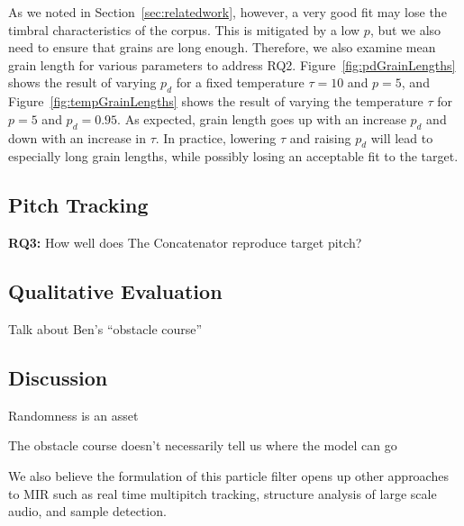 \documentclass{article}
\begin{document}
As we noted in Section~\ref{sec:relatedwork}, however, a very good fit may lose the timbral characteristics of the corpus.  This is mitigated by a low $p$, but we also need to ensure that grains are long enough.  Therefore, we also examine mean grain length for various parameters to address RQ2.  Figure~\ref{fig:pdGrainLengths} shows the result of varying $p_d$ for a fixed temperature $\tau=10$ and $p=5$, and Figure~\ref{fig:tempGrainLengths} shows the result of varying the temperature $\tau$ for $p=5$ and $p_d = 0.95$.  As expected, grain length goes up with an increase $p_d$ and down with an increase in $\tau$.  In practice, lowering $\tau$ and raising $p_d$ will lead to especially long grain lengths, while possibly losing an acceptable fit to the target.


\subsection{Pitch Tracking}
\label{sec:quantitativepitch}

\textbf{RQ3:} How well does The Concatenator reproduce target pitch?




\subsection{Qualitative Evaluation}

Talk about Ben's ``obstacle course''

\subsection{Discussion}

Randomness is an asset

The obstacle course doesn't necessarily tell us where the model can go

We also believe the formulation of this particle filter opens up other approaches to MIR such as real time multipitch tracking, structure analysis of large scale audio, and sample detection.



%
%
%
%
%
\end{document}
